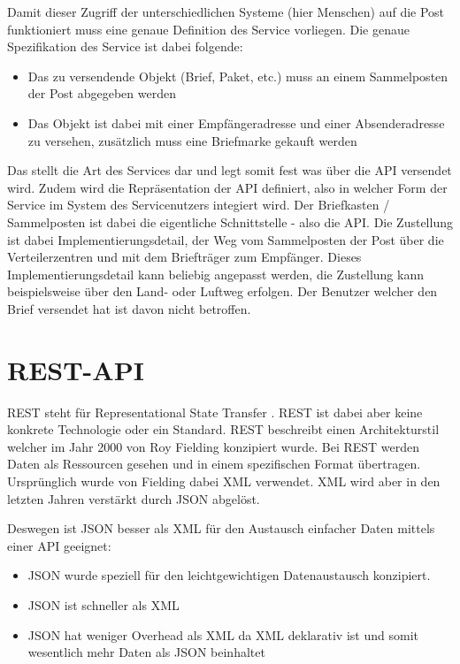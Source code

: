 Damit dieser Zugriff der unterschiedlichen Systeme (hier Menschen) auf die Post funktioniert muss eine genaue Definition des Service vorliegen. Die genaue Spezifikation des Service ist dabei folgende:
\begin{itemize}
 \item Das zu versendende Objekt (Brief, Paket, etc.) muss an einem Sammelposten der Post abgegeben werden
 \item Das Objekt ist dabei mit einer Empfängeradresse und einer Absenderadresse zu versehen, zusätzlich muss eine Briefmarke gekauft werden
\end{itemize}
Das stellt die Art des Services dar und legt somit fest was über die API versendet wird. Zudem wird die Repräsentation der API definiert, also in welcher Form der Service im System des Servicenutzers integiert wird.
Der Briefkasten / Sammelposten ist dabei die eigentliche Schnittstelle - also die API. Die Zustellung ist dabei Implementierungsdetail, der Weg vom Sammelposten der Post über die Verteilerzentren und mit dem Briefträger zum Empfänger.
Dieses Implementierungsdetail kann beliebig angepasst werden, die Zustellung kann beispielsweise über den Land- oder Luftweg erfolgen. Der Benutzer welcher den Brief versendet hat ist davon nicht betroffen.

\section{REST-API}
REST steht für Representational State Transfer \cite{wheeler1952use}. REST ist dabei aber keine konkrete Technologie oder ein Standard. REST beschreibt einen Architekturstil welcher im Jahr 2000 von Roy Fielding konzipiert wurde.
Bei REST werden Daten als Ressourcen gesehen und in einem spezifischen Format übertragen. Ursprünglich wurde von Fielding dabei XML verwendet. XML wird aber in den letzten Jahren verstärkt durch JSON abgelöst.
\newline


Deswegen ist JSON besser als XML für den Austausch einfacher Daten mittels einer API geeignet:
\begin{itemize}
    \item JSON wurde speziell für den leichtgewichtigen Datenaustausch konzipiert.
    \item JSON ist schneller als XML
    \item JSON hat weniger Overhead als XML da XML deklarativ ist und somit wesentlich mehr Daten als JSON beinhaltet
\end{itemize}

